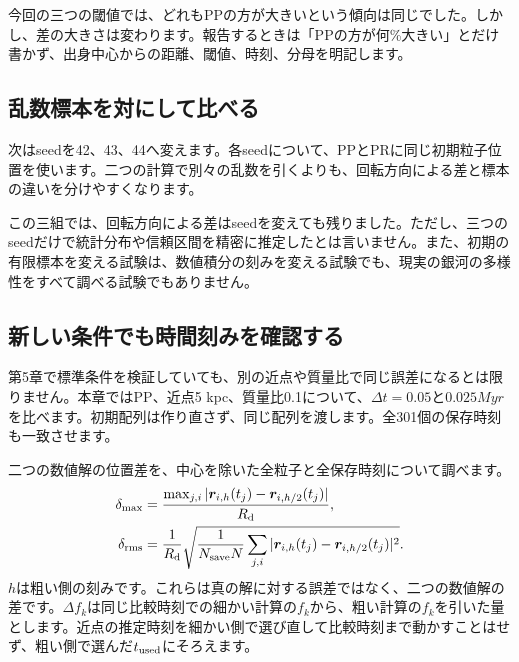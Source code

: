 今回の三つの閾値では、どれもPPの方が大きいという傾向は同じでした。しかし、差の大きさは変わります。報告するときは「PPの方が何\%大きい」とだけ書かず、出身中心からの距離、閾値、時刻、分母を明記します。

\subsection{乱数標本を対にして比べる}
次はseedを42、43、44へ変えます。各seedについて、PPとPRに同じ初期粒子位置を使います。二つの計算で別々の乱数を引くよりも、回転方向による差と標本の違いを分けやすくなります。
\begin{table}[htbp]\centering\small
\caption{三つのseedでのPP--PR比較。各行が同じ標本から作った一組です。全行で$\tau\simeq0.20\unit{Gyr}$、$s_{\rm cut}=30\unit{kpc}$です。}\label{tab:ch6-seed}

\end{table}

この三組では、回転方向による差はseedを変えても残りました。ただし、三つのseedだけで統計分布や信頼区間を精密に推定したとは言いません。また、初期の有限標本を変える試験は、数値積分の刻みを変える試験でも、現実の銀河の多様性をすべて調べる試験でもありません。

\subsection{新しい条件でも時間刻みを確認する}
第5章で標準条件を検証していても、別の近点や質量比で同じ誤差になるとは限りません。本章ではPP、近点5 kpc、質量比0.1について、$\Delta t=0.05$と$0.025\unit{Myr}$を比べます。初期配列は作り直さず、同じ配列を渡します。全301個の保存時刻も一致させます。

二つの数値解の位置差を、中心を除いた全粒子と全保存時刻について調べます。
\begin{align}
 \delta_{\max}&=\frac{\max_{j,i}|\boldsymbol r_{i,h}(t_j)-\boldsymbol r_{i,h/2}(t_j)|}{R_{\rm d}},\\
 \delta_{\rm rms}&=\frac{1}{R_{\rm d}}\sqrt{\frac{1}{N_{\rm save}N}\sum_{j,i}|\boldsymbol r_{i,h}(t_j)-\boldsymbol r_{i,h/2}(t_j)|^2}.
 \label{eq:ch6-position-differences}
\end{align}
$h$は粗い側の刻みです。これらは真の解に対する誤差ではなく、二つの数値解の差です。$\Delta f_k$は同じ比較時刻での細かい計算の$f_k$から、粗い計算の$f_k$を引いた量とします。近点の推定時刻を細かい側で選び直して比較時刻まで動かすことはせず、粗い側で選んだ$t_{\rm used}$にそろえます。
\begin{table}[htbp]\centering\small
\caption{0.05/0.025 Myrの刻み比較。位置差は全301時刻、$\Delta f_k$は表\ref{tab:ch6-timing}の同一時刻で測定します。$e_{E,\rm c}$は第5章と同じ尺度で規格化した中心軌道のエネルギー誤差です。}\label{tab:ch6-resolution}

\end{table}

